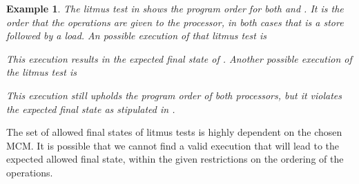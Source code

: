 \documentclass[runningheads]{llncs}
\newtheorem{exa}{Example}
\begin{document}
\begin{exa}
\label{exa:litmus2}
The litmus test in  shows the program order for both {} and {}.
It is the order that the operations are given to the processor, in both cases that is a store followed by a load.
An possible execution of that litmus test is
\begin{table}[H]
\begin{center}
{}
\end{center}
\end{table}
\vspace{-1cm}

This execution results in the expected final state of {}.
Another possible execution of the litmus test is
\begin{table}[H]
\begin{center}
{}
\end{center}
\end{table}
\vspace{-1cm}

This execution still upholds the program order of both processors, but it violates the expected final state as stipulated in .
\end{exa}

The set of allowed final states of litmus tests is highly dependent on the chosen MCM.
It is possible that we cannot find a valid execution that will lead to the expected allowed final state, within the given restrictions on the ordering of the operations.
\end{document}
